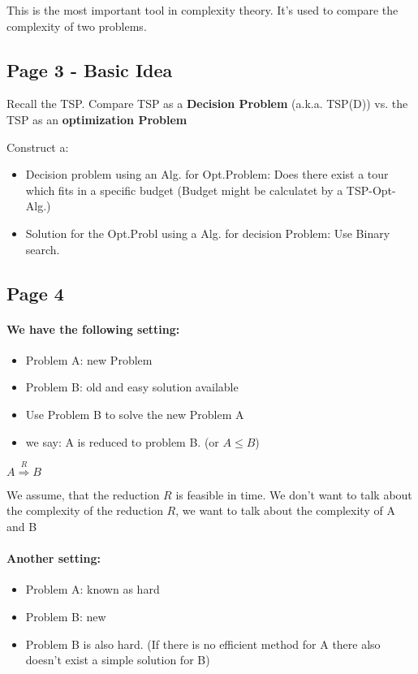 \documentclass[a4paper]{article}
\begin{document}
This is the most important tool in complexity theory. It's used to compare the
complexity of two problems.

\subsection{Page 3 - Basic Idea}

Recall the TSP.
Compare TSP as a \textbf{Decision Problem} (a.k.a. TSP(D)) vs. the TSP as an
\textbf{optimization Problem}

Construct a:
\begin{itemize}
\item Decision problem using an Alg. for Opt.Problem: Does there exist a tour
which fits in a specific budget (Budget might be calculatet by a TSP-Opt-Alg.)
\item Solution for the Opt.Probl using a Alg. for decision Problem: Use
Binary search.
\end{itemize}

\subsection{Page 4}
\paragraph{We have the following setting:}
\begin{itemize}
  \item Problem A: new Problem
  \item Problem B: old and easy solution available
  \item Use Problem B to solve the new Problem A
  \item we say: A is reduced to problem B. (or $A \leq B$)
\end{itemize}

$ A \stackrel{R}{\Longrightarrow} B $

We assume, that the reduction $R$ is feasible in time. We don't want to talk
about the complexity of the reduction $R$, we want to talk about the complexity
of A and B
\paragraph{Another setting:}
\begin{itemize}
  \item Problem A: known as hard
  \item Problem B: new
  \item Problem B is also hard. (If there is no efficient method for A there
  also doesn't exist a simple solution for B)
\end{itemize}
\end{document}
